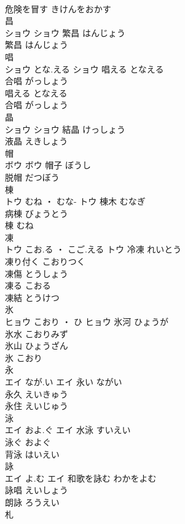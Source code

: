 \documentclass[8pt]{extreport}
\begin{document}
\begin{CJK}{UTF8}{min}
\\	危険を冒す	きけんをおかす	
\\	昌	
\\	ショウ		ショウ	繁昌	はんじょう	
\\	繁昌	はんじょう	
\\	唱	
\\	ショウ	とな.える	ショウ	唱える	となえる	
\\	合唱	がっしょう	
\\	唱える	となえる	
\\	合唱	がっしょう	
\\	晶	
\\	ショウ		ショウ	結晶	けっしょう	
\\	液晶	えきしょう	
\\	帽	
\\	ボウ		ボウ	帽子	ぼうし	
\\	脱帽	だつぼう	
\\	棟	
\\	トウ	むね ・ むな-	トウ	棟木	むなぎ	
\\	病棟	びょうとう	
\\	棟	むね	
\\	凍	
\\	トウ	こお.る ・ こご.える	トウ	冷凍	れいとう	
\\	凍り付く	こおりつく	
\\	凍傷	とうしょう	
\\	凍る	こおる	
\\	凍結	とうけつ	
\\	氷	
\\	ヒョウ	こおり ・ ひ	ヒョウ	氷河	ひょうが	
\\	氷水	こおりみず	
\\	氷山	ひょうざん	
\\	氷	こおり	
\\	永	
\\	エイ	なが.い	エイ	永い	ながい	
\\	永久	えいきゅう	
\\	永住	えいじゅう	
\\	泳	
\\	エイ	およ.ぐ	エイ	水泳	すいえい	
\\	泳ぐ	およぐ	
\\	背泳	はいえい	
\\	詠	
\\	エイ	よ.む	エイ	和歌を詠む	わかをよむ	
\\	詠唱	えいしょう	
\\	朗詠	ろうえい	
\\	札	

\end{CJK}
\end{document}
